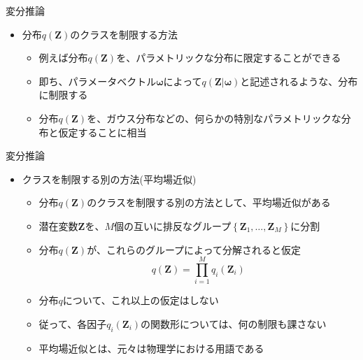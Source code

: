 \documentclass[dvipdfmx,notheorems,t]{beamer}
\begin{document}
\begin{frame}{変分推論}

\begin{itemize}
	\item 分布$q(\bm{Z})$のクラスを制限する方法
	\begin{itemize}
		\item 例えば分布$q(\bm{Z})$を、\alert{パラメトリックな分布に限定}することができる
		\item 即ち、パラメータベクトル$\bm{\omega}$によって$q(\bm{Z} | \bm{\omega})$と記述されるような、分布に制限する
		\newline
		\item 分布$q(\bm{Z})$を、ガウス分布などの、何らかの特別なパラメトリックな分布と仮定することに相当
	\end{itemize}
\end{itemize}

\end{frame}

\begin{frame}{変分推論}

\begin{itemize}
	\item クラスを制限する別の方法(\alert{平均場近似})
	\begin{itemize}
		\item 分布$q(\bm{Z})$のクラスを制限する別の方法として、\alert{平均場近似}がある
		\newline
		\item 潜在変数$\bm{Z}$を、$M$個の\color{red}互いに排反なグループ$\left\{ \bm{Z}_1, \ldots, \bm{Z}_M \right\}$に分割\normalcolor
		\item 分布$q(\bm{Z})$が、\alert{これらのグループによって分解されると仮定}
		\begin{equation}
			q(\bm{Z}) = \prod_{i = 1}^M q_i(\bm{Z}_i)
		\end{equation}
		
		\item 分布$q$について、\alert{これ以上の仮定はしない}
		\item 従って、各因子$q_i(\bm{Z}_i)$の関数形については、\alert{何の制限も課さない}
		\newline
		\item 平均場近似とは、元々は物理学における用語である
	\end{itemize}
\end{itemize}

\end{frame}
\end{document}
